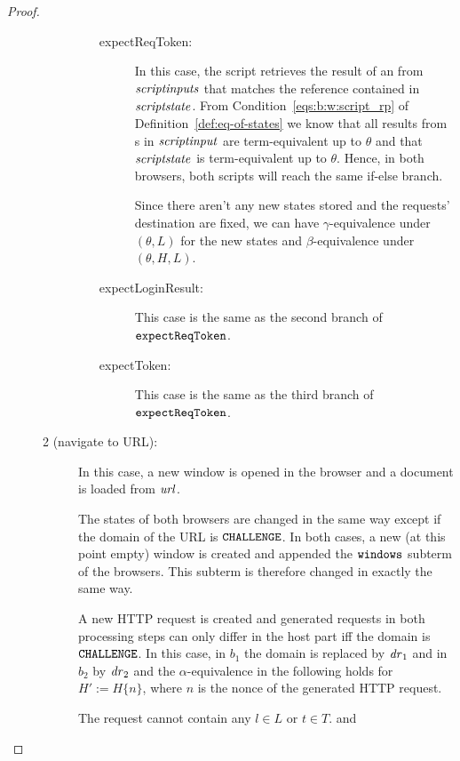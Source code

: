 \begin{theorem}
\begin{proof}
\begin{description}
\begin{description}
\begin{enumerate}
\begin{description}
            \item[expectReqToken:] In this case, the script
              retrieves the result of an \xhr from 
              $\mathit{scriptinputs}$ that matches the reference 
              contained in $\mathit{scriptstate}$. From
              Condition~\ref{eqs:b:w:script_rp} of
              Definition~\ref{def:eq-of-states} we know that all 
              results from \xhr{}s in $\mathit{scriptinput}$ are 
              term-equivalent up to $\theta$ and that 
              $\mathit{scriptstate}$ is term-equivalent up to 
              $\theta$. Hence, in both browsers, both scripts 
              will reach the same if-else branch.
  
              Since there aren't any new states stored and the
              requests' destination are fixed, we can have 
              $\gamma$-equivalence under $(\theta,L)$ for the 
              new states and $\beta$-equivalence under 
              $(\theta,H,L)$. 
              \item[expectLoginResult:] This case is the same as 
                the second branch of $\mathtt{expectReqToken}$.
              \item[expectToken:] This case is the same as 
                the third branch of $\mathtt{expectReqToken}$.
            \end{description}
          \end{enumerate}
        \item[2 (navigate to URL):] 
        In this case, a new window is opened
        in the browser and a document is loaded from $\mathit{url}$.
  
        The states of both browsers are changed in the same way except
        if the domain of the URL is $\mathtt{CHALLENGE}$. In both cases, a
        new (at this point empty) window is created and appended the
        $\mathtt{windows}$ subterm of the browsers. This subterm is
        therefore changed in exactly the same way.
  
        A new HTTP request is created and generated requests in 
        both processing
        steps can only differ in the host part iff the domain is
        $\mathtt{CHALLENGE}$. In this case, in $b_1$ the domain is replaced
        by $\mathit{dr}_1$ and in $b_2$ by $\mathit{dr}_2$ and the
        $\alpha$-equivalence in the following holds for $H' := H \{n\}$,
        where $n$ is the nonce of the generated HTTP request.
  
        The request cannot contain any $l \in L$ or $t \in T$.
        and 
        

\end{description}
\end{description}
\end{proof}
\end{theorem}
